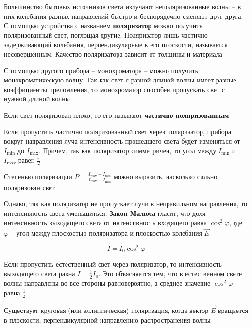\documentclass[12pt]{article}
\begin{document}
Большинство бытовых источников света излучают неполяризованные волны -- в них колебания разных направлений быстро и беспорядочно сменяют друг друга. С помощью устройства с названием \textbf{поляризатор} можно получить поляризованный свет, поглощая другие. Поляризатор лишь частично задерживающий колебания, перпендикулярные к его плоскости, называется несовершенным. Качество поляризатора зависит от толщины и материала

С помощью другого прибора -- монохроматора -- можно получить монохроматическую волну. Так как свет с разной длиной волны имеет разные коэффициенты преломления, то монохроматор способен пропускать свет с нужной длиной волны

Если свет поляризован плохо, то его называют \textbf{частично поляризованным}


Если пропустить частично поляризованный свет через поляризатор, прибора вокруг направления луча интенсивность прошедшего света будет изменяться от $I_\min$ до $I_\max$. Причем, так как поляризатор симметричен, то угол между $I_\min$ и $I_\max$ равен $\frac{\pi}{2}$

Степенью поляризации $P = \frac{I_{\max} - I_\min}{I_{\max} + I_\min}$ можно выразить, насколько сильно поляризован свет 

\mediumvspace

Однако, так как поляризатор не пропускает лучи в неправильном направлении, то интенсивность света уменьшиться. \textbf{Закон Малюса} гласит, что доля интенсивность выходящего света от интенсивность входящего равна $\cos^2 \varphi$, где $\varphi$ -- угол между плоскостью поляризатора и плоскостью колебания $\vec E$

\[I = I_0 \cos^2 \varphi\]

Если пропустить естественный свет через поляризатор, то интенсивность выходящего света равна $I = \frac{1}{2} I_0$. Это объясняется тем, что в естественном свете волны направлены во все стороны равновероятно, а среднее значение $\cos^2 \varphi$ равна $\frac{1}{2}$

\mediumvspace

Существует круговая (или эллиптическая) поляризация, когда вектор $\vec E$ вращается в плоскости, перпендикулярной направлению распространения волны



\end{document}
